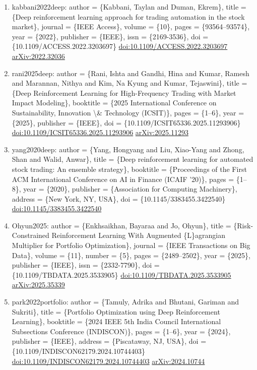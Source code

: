 \documentclass[11pt]{article}
\begin{document}
\begin{enumerate}[leftmargin=*]
  \item kabbani2022deep: author = \{Kabbani, Taylan and Duman, Ekrem\}, title = \{Deep reinforcement learning approach for trading automation in the stock market\}, journal = \{IEEE Access\}, volume = \{10\}, pages = \{93564--93574\}, year = \{2022\}, publisher = \{IEEE\}, issn = \{2169-3536\}, doi = \{10.1109/ACCESS.2022.3203697\} \href{https://doi.org/10.1109/ACCESS.2022.3203697}{doi:10.1109/ACCESS.2022.3203697} \href{https://arxiv.org/abs/2022.32036}{arXiv:2022.32036}
  \item rani2025deep: author = \{Rani, Ishta and Gandhi, Hina and Kumar, Ramesh and Marannan, Nithya and Kim, Na Kyung and Kumar, Tejaswini\}, title = \{Deep Reinforcement Learning for High-Frequency Trading with Market Impact Modeling\}, booktitle = \{2025 International Conference on Sustainability, Innovation \textbackslash{}\& Technology (ICSIT)\}, pages = \{1--6\}, year = \{2025\}, publisher = \{IEEE\}, doi = \{10.1109/ICSIT65336.2025.11293906\} \href{https://doi.org/10.1109/ICSIT65336.2025.11293906}{doi:10.1109/ICSIT65336.2025.11293906} \href{https://arxiv.org/abs/2025.11293}{arXiv:2025.11293}
  \item yang2020deep: author = \{Yang, Hongyang and Liu, Xiao-Yang and Zhong, Shan and Walid, Anwar\}, title = \{Deep reinforcement learning for automated stock trading: An ensemble strategy\}, booktitle = \{Proceedings of the First ACM International Conference on AI in Finance (ICAIF '20)\}, pages = \{1--8\}, year = \{2020\}, publisher = \{Association for Computing Machinery\}, address = \{New York, NY, USA\}, doi = \{10.1145/3383455.3422540\} \href{https://doi.org/10.1145/3383455.3422540}{doi:10.1145/3383455.3422540}
  \item Ohyun2025: author = \{Enkhsaikhan, Bayaraa and Jo, Ohyun\}, title = \{Risk-Constrained Reinforcement Learning With Augmented \{L\}agrangian Multiplier for Portfolio Optimization\}, journal = \{IEEE Transactions on Big Data\}, volume = \{11\}, number = \{5\}, pages = \{2489--2502\}, year = \{2025\}, publisher = \{IEEE\}, issn = \{2332-7790\}, doi = \{10.1109/TBDATA.2025.3533905\} \href{https://doi.org/10.1109/TBDATA.2025.3533905}{doi:10.1109/TBDATA.2025.3533905} \href{https://arxiv.org/abs/2025.35339}{arXiv:2025.35339}
  \item park2022portfolio: author = \{Tamuly, Adrika and Bhutani, Gariman and Sukriti\}, title = \{Portfolio Optimization using Deep Reinforcement Learning\}, booktitle = \{2024 IEEE 5th India Council International Subsections Conference (INDISCON)\}, pages = \{1--6\}, year = \{2024\}, publisher = \{IEEE\}, address = \{Piscataway, NJ, USA\}, doi = \{10.1109/INDISCON62179.2024.10744403\} \href{https://doi.org/10.1109/INDISCON62179.2024.10744403}{doi:10.1109/INDISCON62179.2024.10744403} \href{https://arxiv.org/abs/2024.10744}{arXiv:2024.10744}

\end{enumerate}
\end{document}
